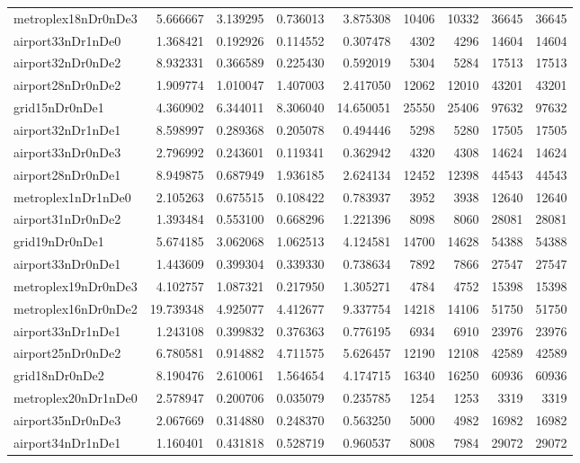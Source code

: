 \begin{longtable}{|l|r|r|r|r|r|r|r|r|}
metroplex18nDr0nDe3 & 5.666667 & 3.139295 & 0.736013 & 3.875308 & 10406 & 10332 & 36645 & 36645 \\
airport33nDr1nDe0 & 1.368421 & 0.192926 & 0.114552 & 0.307478 & 4302 & 4296 & 14604 & 14604 \\
airport32nDr0nDe2 & 8.932331 & 0.366589 & 0.225430 & 0.592019 & 5304 & 5284 & 17513 & 17513 \\
airport28nDr0nDe2 & 1.909774 & 1.010047 & 1.407003 & 2.417050 & 12062 & 12010 & 43201 & 43201 \\
grid15nDr0nDe1 & 4.360902 & 6.344011 & 8.306040 & 14.650051 & 25550 & 25406 & 97632 & 97632 \\
airport32nDr1nDe1 & 8.598997 & 0.289368 & 0.205078 & 0.494446 & 5298 & 5280 & 17505 & 17505 \\
airport33nDr0nDe3 & 2.796992 & 0.243601 & 0.119341 & 0.362942 & 4320 & 4308 & 14624 & 14624 \\
airport28nDr0nDe1 & 8.949875 & 0.687949 & 1.936185 & 2.624134 & 12452 & 12398 & 44543 & 44543 \\
metroplex1nDr1nDe0 & 2.105263 & 0.675515 & 0.108422 & 0.783937 & 3952 & 3938 & 12640 & 12640 \\
airport31nDr0nDe2 & 1.393484 & 0.553100 & 0.668296 & 1.221396 & 8098 & 8060 & 28081 & 28081 \\
grid19nDr0nDe1 & 5.674185 & 3.062068 & 1.062513 & 4.124581 & 14700 & 14628 & 54388 & 54388 \\
airport33nDr0nDe1 & 1.443609 & 0.399304 & 0.339330 & 0.738634 & 7892 & 7866 & 27547 & 27547 \\
metroplex19nDr0nDe3 & 4.102757 & 1.087321 & 0.217950 & 1.305271 & 4784 & 4752 & 15398 & 15398 \\
metroplex16nDr0nDe2 & 19.739348 & 4.925077 & 4.412677 & 9.337754 & 14218 & 14106 & 51750 & 51750 \\
airport33nDr1nDe1 & 1.243108 & 0.399832 & 0.376363 & 0.776195 & 6934 & 6910 & 23976 & 23976 \\
airport25nDr0nDe2 & 6.780581 & 0.914882 & 4.711575 & 5.626457 & 12190 & 12108 & 42589 & 42589 \\
grid18nDr0nDe2 & 8.190476 & 2.610061 & 1.564654 & 4.174715 & 16340 & 16250 & 60936 & 60936 \\
metroplex20nDr1nDe0 & 2.578947 & 0.200706 & 0.035079 & 0.235785 & 1254 & 1253 & 3319 & 3319 \\
airport35nDr0nDe3 & 2.067669 & 0.314880 & 0.248370 & 0.563250 & 5000 & 4982 & 16982 & 16982 \\
airport34nDr1nDe1 & 1.160401 & 0.431818 & 0.528719 & 0.960537 & 8008 & 7984 & 29072 & 29072 \\

\end{longtable}
